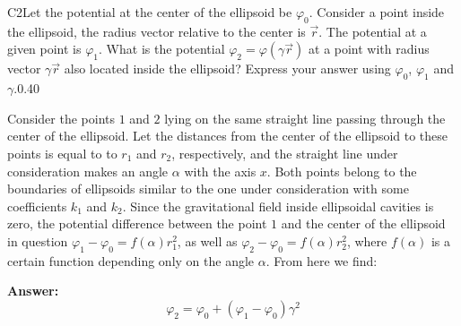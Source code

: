 \documentclass[11pt,a4paper]{article}
\begin{document}
\begin{solcard}{C2}{Let the potential at the center of the ellipsoid be $\varphi_0$. Consider a point inside the ellipsoid, the radius vector relative to the center is $\vec{r}$. The potential at a given point is $\varphi_1$. What is the potential $\varphi_2=\varphi(\gamma\vec{r})$ at a point with radius vector $\gamma\vec{r}$ also located inside the ellipsoid? Express your answer using $\varphi_0$, $\varphi_1$ and $\gamma$.}{0.40}

Consider the points $1$ and $2$ lying on the same straight line passing through the center of the ellipsoid. Let the distances from the center of the ellipsoid to these points is equal to to $r_1$ and $r_2$, respectively, and the straight line under consideration makes an angle $\alpha$ with the axis $x$. Both points belong to the boundaries of ellipsoids similar to the one under consideration with some coefficients $k_1$ and $k_2$. Since the gravitational field inside ellipsoidal cavities is zero, the potential difference between the point $1$ and the center of the ellipsoid in question $\varphi_1-\varphi_0=f(\alpha)r^2_1$, as well as $\varphi_2-\varphi_0=f(\alpha)r^2_2$, where $f(\alpha)$ is a certain function depending only on the angle $\alpha$. From here we find:

\par\smallskip\noindent\textbf{Answer:} $$\varphi_2=\varphi_0+(\varphi_1-\varphi_0)\gamma^2 $$
\end{solcard}
\end{document}
